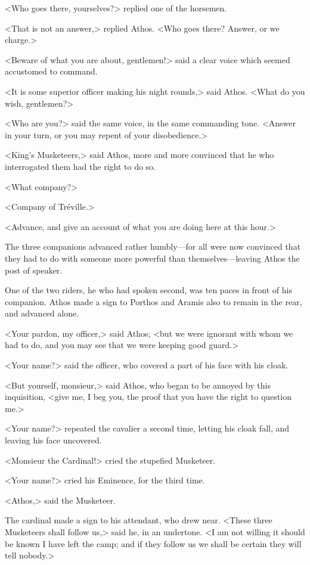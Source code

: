<Who goes there, yourselves?> replied one of the horsemen. 

<That is not an answer,> replied Athos. <Who goes there? Answer, or we charge.> 

<Beware of what you are about, gentlemen!> said a clear voice which seemed accustomed to command. 

<It is some superior officer making his night rounds,> said Athos. <What do you wish, gentlemen?> 

<Who are you?> said the same voice, in the same commanding tone. <Answer in your turn, or you may repent of your disobedience.> 

<King's Musketeers,> said Athos, more and more convinced that he who interrogated them had the right to do so. 

<What company?> 

<Company of Tréville.> 

<Advance, and give an account of what you are doing here at this hour.> 

The three companions advanced rather humbly—for all were now convinced that they had to do with someone more powerful than themselves—leaving Athos the post of speaker. 

One of the two riders, he who had spoken second, was ten paces in front of his companion. Athos made a sign to Porthos and Aramis also to remain in the rear, and advanced alone. 

<Your pardon, my officer,> said Athos; <but we were ignorant with whom we had to do, and you may see that we were keeping good guard.> 

<Your name?> said the officer, who covered a part of his face with his cloak. 

<But yourself, monsieur,> said Athos, who began to be annoyed by this inquisition, <give me, I beg you, the proof that you have the right to question me.> 

<Your name?> repeated the cavalier a second time, letting his cloak fall, and leaving his face uncovered. 

<Monsieur the Cardinal!> cried the stupefied Musketeer. 

<Your name?> cried his Eminence, for the third time. 

<Athos,> said the Musketeer. 

The cardinal made a sign to his attendant, who drew near. <These three Musketeers shall follow us,> said he, in an undertone. <I am not willing it should be known I have left the camp; and if they follow us we shall be certain they will tell nobody.> 

